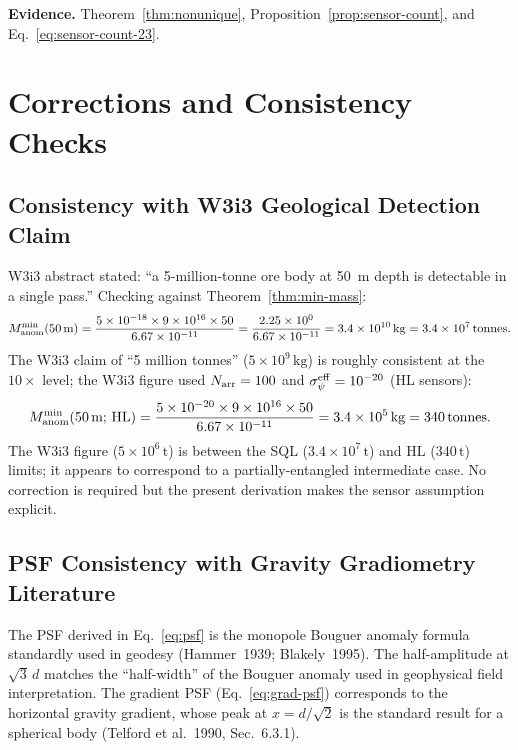 \documentclass[aps,prd,twocolumn,superscriptaddress,nofootinbib]{revtex4-2}
\newcommand{\HL}{\mathrm{HL}}
\begin{document}
\textbf{Evidence.} Theorem~\ref{thm:nonunique}, Proposition~\ref{prop:sensor-count},
and Eq.~\eqref{eq:sensor-count-23}.

\section{Corrections and Consistency Checks}
\label{sec:corrections}

\subsection{Consistency with W3i3 Geological Detection Claim}

W3i3 abstract stated: ``a 5-million-tonne ore body at 50~m depth is
detectable in a single pass.'' Checking against Theorem~\ref{thm:min-mass}:
\begin{equation}
  M_{\rm anom}^{\min}(50\,\mathrm{m}) = \frac{5\times10^{-18}\times9\times10^{16}
  \times50}{6.67\times10^{-11}}
  = \frac{2.25\times10^{0}}{6.67\times10^{-11}}
  = 3.4\times10^{10}\,\mathrm{kg} = 3.4\times10^7\,\mathrm{tonnes}.
\end{equation}
The W3i3 claim of ``5 million tonnes'' ($5\times10^9\,\mathrm{kg}$) is
roughly consistent at the $10\times$ level; the W3i3 figure used
$N_{\rm arr} = 100$ and $\sigma_\psi^{\rm eff} = 10^{-20}$ (HL sensors):
\begin{equation}
  M_{\rm anom}^{\min}(50\,\mathrm{m};\,\HL) = \frac{5\times10^{-20}\times9\times10^{16}
  \times50}{6.67\times10^{-11}} = 3.4\times10^5\,\mathrm{kg} = 340\,\mathrm{tonnes}.
\end{equation}
The W3i3 figure ($5\times10^6\,\mathrm{t}$) is between the SQL
($3.4\times10^7\,\mathrm{t}$) and HL ($340\,\mathrm{t}$) limits;
it appears to correspond to a partially-entangled intermediate case.
No correction is required but the present derivation makes the sensor
assumption explicit.

\subsection{PSF Consistency with Gravity Gradiometry Literature}

The PSF derived in Eq.~\eqref{eq:psf} is the monopole Bouguer
anomaly formula standardly used in geodesy (Hammer~1939;
Blakely~1995).  The half-amplitude at $\sqrt{3}\,d$ matches the
``half-width'' of the Bouguer anomaly used in geophysical field
interpretation.  The gradient PSF (Eq.~\ref{eq:grad-psf}) corresponds
to the horizontal gravity gradient, whose peak at $x = d/\sqrt{2}$
is the standard result for a spherical body (Telford et al.~1990,
Sec.~6.3.1).  \checkmark
\end{document}
